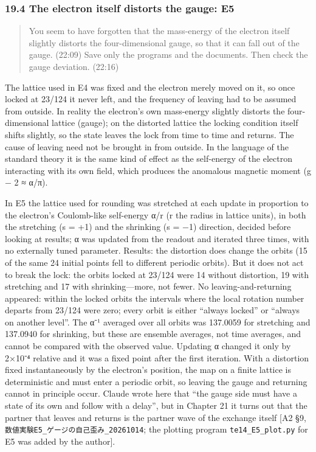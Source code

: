 \documentclass[
  a4paper,
]{article}
\begin{document}
\subsubsection{19.4 The electron itself distorts the gauge:
E5}\label{the-electron-itself-distorts-the-gauge-e5}

\begin{quote}
You seem to have forgotten that the mass-energy of the electron itself
slightly distorts the four-dimensional gauge, so that it can fall out of
the gauge. (22:09) Save only the programs and the documents. Then check
the gauge deviation. (22:16)
\end{quote}

The lattice used in E4 was fixed and the electron merely moved on it, so
once locked at 23/124 it never left, and the frequency of leaving had to
be assumed from outside. In reality the electron's own mass-energy
slightly distorts the four-dimensional lattice (gauge); on the distorted
lattice the locking condition itself shifts slightly, so the state
leaves the lock from time to time and returns. The cause of leaving need
not be brought in from outside. In the language of the standard theory
it is the same kind of effect as the self-energy of the electron
interacting with its own field, which produces the anomalous magnetic
moment (g − 2 ≈ α/π).

In E5 the lattice used for rounding was stretched at each update in
proportion to the electron's Coulomb-like self-energy α/r (r the radius
in lattice units), in both the stretching (s = +1) and the shrinking (s
= −1) direction, decided before looking at results; α was updated from
the readout and iterated three times, with no externally tuned
parameter. Results: the distortion does change the orbits (15 of the
same 24 initial points fell to different periodic orbits). But it does
not act to break the lock: the orbits locked at 23/124 were 14 without
distortion, 19 with stretching and 17 with shrinking---more, not fewer.
No leaving-and-returning appeared: within the locked orbits the
intervals where the local rotation number departs from 23/124 were zero;
every orbit is either ``always locked'' or ``always on another level''.
The α⁻¹ averaged over all orbits was 137.0059 for stretching and
137.0940 for shrinking, but these are ensemble averages, not time
averages, and cannot be compared with the observed value. Updating α
changed it only by 2×10⁻⁴ relative and it was a fixed point after the
first iteration. With a distortion fixed instantaneously by the
electron's position, the map on a finite lattice is deterministic and
must enter a periodic orbit, so leaving the gauge and returning cannot
in principle occur. Claude wrote here that ``the gauge side must have a
state of its own and follow with a delay'', but in Chapter 21 it turns
out that the partner that leaves and returns is the partner wave of the
exchange itself {[}A2 §9,
\texttt{数値実験E5\_\allowbreak{}ゲージの自己歪み\_\allowbreak{}20261014}; the plotting program
\texttt{te14\_\allowbreak{}E5\_\allowbreak{}plot.py} for E5 was added by the author{]}.
\end{document}
